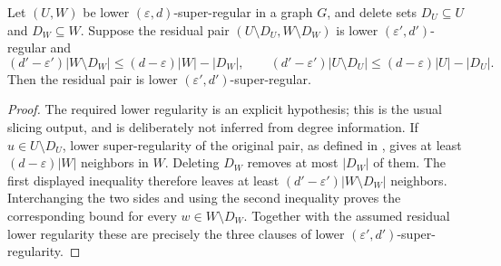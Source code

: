 \begin{lemma}
Let $(U,W)$ be lower $(\varepsilon,d)$-super-regular in a graph $G$, and delete sets $D_U\subseteq U$ and $D_W\subseteq W$.  Suppose the residual pair $(U\setminus D_U,W\setminus D_W)$ is lower $(\varepsilon',d')$-regular and
\[
(d'-\varepsilon')|W\setminus D_W|\leq(d-\varepsilon)|W|-|D_W|,
\qquad
(d'-\varepsilon')|U\setminus D_U|\leq(d-\varepsilon)|U|-|D_U|.
\]
Then the residual pair is lower $(\varepsilon',d')$-super-regular.
\end{lemma}
\begin{proof}
The required lower regularity is an explicit hypothesis; this is the usual slicing output, and is deliberately not inferred from degree information.  If $u\in U\setminus D_U$, lower super-regularity of the original pair, as defined in , gives at least $(d-\varepsilon)|W|$ neighbors in $W$.  Deleting $D_W$ removes at most $|D_W|$ of them.  The first displayed inequality therefore leaves at least $(d'-\varepsilon')|W\setminus D_W|$ neighbors.  Interchanging the two sides and using the second inequality proves the corresponding bound for every $w\in W\setminus D_W$.  Together with the assumed residual lower regularity these are precisely the three clauses of lower $(\varepsilon',d')$-super-regularity.
\end{proof}
